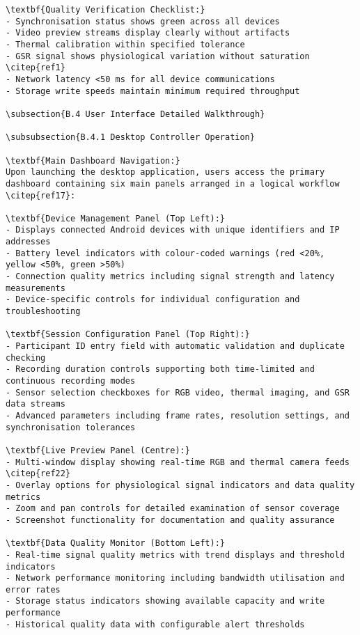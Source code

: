 \begin{verbatim}
\textbf{Quality Verification Checklist:}
- Synchronisation status shows green across all devices
- Video preview streams display clearly without artifacts
- Thermal calibration within specified tolerance
- GSR signal shows physiological variation without saturation \citep{ref1}
- Network latency <50 ms for all device communications
- Storage write speeds maintain minimum required throughput

\subsection{B.4 User Interface Detailed Walkthrough}

\subsubsection{B.4.1 Desktop Controller Operation}

\textbf{Main Dashboard Navigation:}
Upon launching the desktop application, users access the primary dashboard containing six main panels arranged in a logical workflow \citep{ref17}:

\textbf{Device Management Panel (Top Left):}
- Displays connected Android devices with unique identifiers and IP addresses
- Battery level indicators with colour-coded warnings (red <20%, yellow <50%, green >50%)
- Connection quality metrics including signal strength and latency measurements
- Device-specific controls for individual configuration and troubleshooting

\textbf{Session Configuration Panel (Top Right):}
- Participant ID entry field with automatic validation and duplicate checking
- Recording duration controls supporting both time-limited and continuous recording modes
- Sensor selection checkboxes for RGB video, thermal imaging, and GSR data streams
- Advanced parameters including frame rates, resolution settings, and synchronisation tolerances

\textbf{Live Preview Panel (Centre):}
- Multi-window display showing real-time RGB and thermal camera feeds \citep{ref22}
- Overlay options for physiological signal indicators and data quality metrics
- Zoom and pan controls for detailed examination of sensor coverage
- Screenshot functionality for documentation and quality assurance

\textbf{Data Quality Monitor (Bottom Left):}
- Real-time signal quality metrics with trend displays and threshold indicators
- Network performance monitoring including bandwidth utilisation and error rates
- Storage status indicators showing available capacity and write performance
- Historical quality data with configurable alert thresholds


\end{verbatim}
